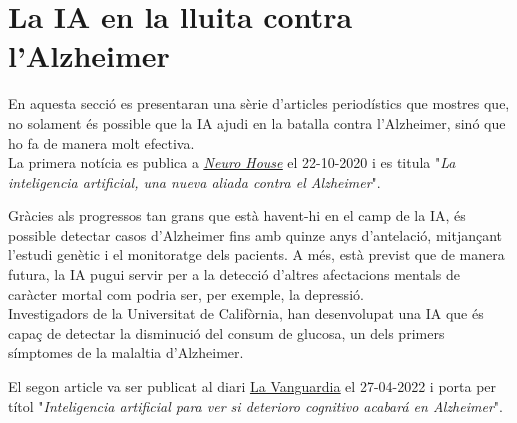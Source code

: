 \documentclass[a4paper,12pt]{report}
\begin{document}
\chapter*{La IA en la lluita contra l'Alzheimer}
En aquesta secció es presentaran una sèrie d'articles periodístics que mostres que, no solament és possible que la IA ajudi en la batalla contra l'Alzheimer, sinó que ho fa de manera molt efectiva.\\
La primera notícia es publica a \href{https://neurohouse.es/espacio-reimagine/la-inteligencia-artificial-una-nueva-aliada-contra-el-alzheimer}{\underline{\textit{Neuro House}}} el 22-10-2020 i es titula "\textit{La inteligencia artificial, una nueva aliada contra el Alzheimer}".
\begin{center}
    \begin{minipage}{0.9\linewidth}
        \vspace{5pt}
        {\small
            Gràcies als progressos tan grans que està havent-hi en el camp de la IA, és possible detectar casos d'Alzheimer fins amb quinze anys d'antelació, mitjançant l'estudi genètic i el monitoratge dels pacients. A més, està previst que de manera futura, la IA pugui servir per a la detecció d'altres afectacions mentals de caràcter mortal com podria ser, per exemple, la depressió.\\
            Investigadors de la Universitat de Califòrnia, han desenvolupat una IA que és capaç de detectar la disminució del consum de glucosa, un dels primers símptomes de la malaltia d'Alzheimer.
        }
        \vspace{5pt}
    \end{minipage}
\end{center}
\newpage
El segon article va ser publicat al diari \href{https://www.lavanguardia.com/vida/20220427/8225520/inteligencia-artificial-ver-deterioro-cognitivo-acabara-alzheimer.html}{\underline{La Vanguardia}} el 27-04-2022 i porta per títol "\textit{Inteligencia artificial para ver si deterioro cognitivo acabará en Alzheimer}".
\end{document}
